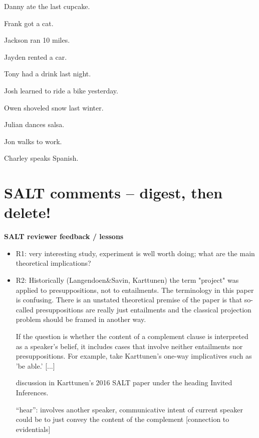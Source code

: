 \documentclass[11pt,fleqn]{article}
\newcommand{\6}{\mbox{$[\hspace*{-.6mm}[$}}
\newcommand{\9}{\mbox{$]\hspace*{-.6mm}]$}}
\begin{document}
{\begin{enumerate}[leftmargin=3ex,itemsep=-2pt]
\begin{multicols}{2}
\columnbreak

\item  Danny ate the last cupcake.
\item  Frank got a cat.
\item  Jackson ran 10 miles.
\item  Jayden rented a car.
\item  Tony had a drink last night.
\item  Josh learned to ride a bike yesterday.
\item  Owen shoveled snow last winter.
\item  Julian dances salsa.
\item  Jon walks to work.
\item  Charley speaks Spanish.

\end{multicols}

\end{enumerate}

\section{SALT comments -- digest, then delete!}


{\bf SALT reviewer feedback / lessons}

\begin{itemize}

\item R1: very interesting study, experiment is well worth doing; what are the main theoretical implications?

\item R2: Historically (Langendoen\&Savin, Karttunen) the term "project" was applied to presuppositions, not to entailments. The terminology in this paper is confusing. There is an unstated theoretical premise of the paper is that so-called presuppositions are really just entailments and the classical projection problem should be framed in another way.

If the question is whether the content of a complement clause is interpreted as a speaker's belief, it includes cases that involve neither entailments nor presuppositions. For example, take Karttunen's one-way implicatives such as 'be able.'  [...]

discussion in Karttunen’s 2016 SALT paper under the heading Invited Inferences.

``hear'': involves another speaker, communicative intent of current speaker could be to just convey the content of the complement [connection to evidentials]


\end{itemize}}
\end{document}
